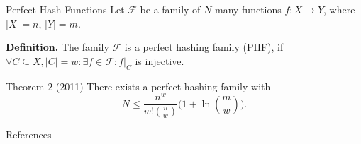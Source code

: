 \documentclass[10pt]{beamer}
\newcommand\restr[2]{\ensuremath{\left.#1\right|_{#2}}}
\begin{document}
\begin{frame}[fragile]{Perfect Hash Functions}
    Let $ \mathcal{F} $ be a family of $ N $-many functions $ f : X \to Y $, where
    $ |X| = n $, $ |Y| = m $.
    
    \textbf{Definition.} The family $ \mathcal{F} $ is a perfect hashing family (PHF), if
    $ \forall C \subseteq X, |C| = w: \exists f \in \mathcal{F}: \restr{f}{C} $ is injective.

    \vfill

    \begin{block}{Theorem 2 (2011)}
        There exists a perfect hashing family with
        \[
            N \leq \frac{n^w}{w!{n \choose w}}\bigg(1 + \ln{m \choose w}\bigg).
        \]
    \end{block}
\end{frame}




\begin{frame}[allowframebreaks]{References}
    \nocite{*}
    
    
\end{frame}
\end{document}
